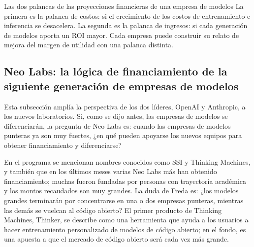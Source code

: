 \documentclass[a4paper]{article}
\begin{document}
\begin{importantbox}{Las dos palancas de las proyecciones financieras de una empresa de modelos}
La primera es la palanca de costos: si el crecimiento de los costos de entrenamiento e inferencia se desacelera. La segunda es la palanca de ingresos: si cada generación de modelos aporta un ROI mayor. Cada empresa puede construir su relato de mejora del margen de utilidad con una palanca distinta.
\end{importantbox}

\subsection{Neo Labs: la lógica de financiamiento de la siguiente generación de empresas de modelos}

Esta subsección amplía la perspectiva de los dos líderes, OpenAI y Anthropic, a los nuevos laboratorios. Si, como se dijo antes, las empresas de modelos se diferenciarán, la pregunta de Neo Labs es: cuando las empresas de modelos punteras ya son muy fuertes, ¿en qué pueden apoyarse los nuevos equipos para obtener financiamiento y diferenciarse?

En el programa se mencionan nombres conocidos como SSI y Thinking Machines, y también que en los últimos meses varias Neo Labs más han obtenido financiamiento; muchas fueron fundadas por personas con trayectoria académica y los montos recaudados son muy grandes. La duda de Freda es: ¿los modelos grandes terminarán por concentrarse en una o dos empresas punteras, mientras las demás se vuelcan al código abierto? El primer producto de Thinking Machines, Thinker, se describe como una herramienta que ayuda a los usuarios a hacer entrenamiento personalizado de modelos de código abierto; en el fondo, es una apuesta a que el mercado de código abierto será cada vez más grande.
\end{document}
